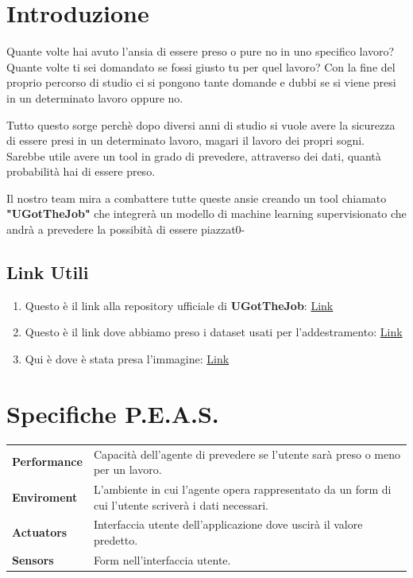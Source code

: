 \documentclass[12pt]{article}
\newcommand{\mainname}{UGotTheJob}
\begin{document}
\newpage %

\tableofcontents

\newpage

\section{Introduzione}
Quante volte hai avuto l'ansia di essere preso o pure no in uno specifico lavoro?
Quante volte ti sei domandato se fossi giusto tu per quel lavoro? Con la fine del proprio percorso
di studio ci si pongono tante domande e dubbi se si viene presi in un determinato lavoro oppure no.
\par
Tutto questo sorge perchè dopo diversi anni di studio si vuole avere la sicurezza di essere presi
in un determinato lavoro, magari il lavoro dei propri sogni. Sarebbe utile avere un tool in grado di
prevedere, attraverso dei dati, quantà probabilità hai di essere preso.
\par
Il nostro team mira a combattere tutte queste ansie creando un tool chiamato \textbf{"\mainname"}
che integrerà un modello di machine learning supervisionato che andrà a prevedere la possibità di essere piazzat0-

\subsection{Link Utili}
\begin{enumerate}
    \item Questo è il link alla repository ufficiale di \textbf{\mainname}: \href{https://github.com/ShackWove/GuessUJob}{Link}
    \item Questo è il link dove abbiamo preso i dataset usati per l'addestramento: \href{https://www.kaggle.com/datasets/ahsan81/job-placement-dataset}{Link}
    \item Qui è dove è stata presa l'immagine: \href{https://www.flaticon.com/free-icon/job-seeking_1503438}{Link}
\end{enumerate}

\section{Specifiche P.E.A.S.}

\begin{table}[ht]
    \centering
    \begin{tabular}{| l | m{8cm} |}
        \hline
        \textbf{Performance} & Capacità dell'agente di prevedere se l'utente sarà preso o meno per un lavoro.                       \\
        \textbf{Enviroment}  & L'ambiente in cui l'agente opera rappresentato da un form di cui l'utente scriverà i dati necessari. \\
        \textbf{Actuators}   & Interfaccia utente dell'applicazione dove uscirà il valore predetto.                                 \\
        \textbf{Sensors}     & Form nell'interfaccia utente.                                                                        \\
        \hline
    \end{tabular}
\end{table}
\end{document}
